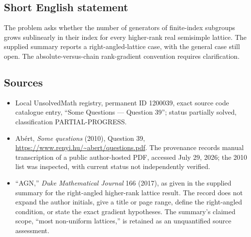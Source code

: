 \documentclass[11pt]{article}
\begin{document}
\subsection{Short English statement}
The problem asks whether the number of generators of finite-index subgroups grows sublinearly in their index for every higher-rank real semisimple lattice. The supplied summary reports a right-angled-lattice case, with the general case still open. The absolute-versus-chain rank-gradient convention requires clarification.
\subsection{Sources}
\begin{itemize}
\item Local UnsolvedMath registry, permanent ID 1200039, exact source code catalogue entry, ``Some Questions --- Question 39''; status partially solved, classification PARTIAL-PROGRESS.
\item Ab\'ert, \emph{Some questions} (2010), Question 39, \url{https://www.renyi.hu/~abert/questions.pdf}. The provenance records manual transcription of a public author-hosted PDF, accessed July 29, 2026; the 2010 list was inspected, with current status not independently verified.
\item ``AGN,'' \emph{Duke Mathematical Journal} 166 (2017), as given in the supplied summary for the right-angled higher-rank lattice result. The record does not expand the author initials, give a title or page range, define the right-angled condition, or state the exact gradient hypotheses. The summary's claimed scope, ``most non-uniform lattices,'' is retained as an unquantified source assessment.
\end{itemize}
\end{document}
